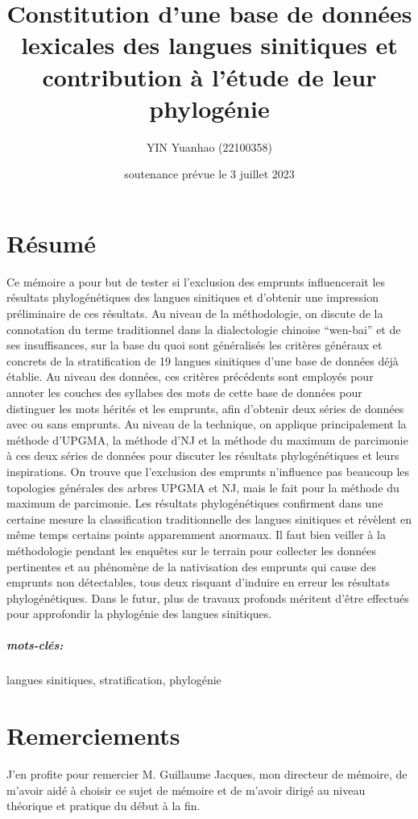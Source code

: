 \documentclass{scrbook}
\title{Constitution d'une base de données lexicales des langues sinitiques et contribution à l'étude de leur phylogénie}
\author{YIN Yuanhao (22100358)}
\date{soutenance prévue le 3 juillet 2023}%
\newcounter{c}[subsubsection]
\begin{document}
\maketitle
\begin{sloppypar}

\frontmatter
\chapter{Résumé}
Ce mémoire a pour but de tester si l'exclusion des emprunts influencerait les résultats phylogénétiques des langues sinitiques et d'obtenir une impression préliminaire de ces résultats. Au niveau de la méthodologie, on discute de la connotation du terme traditionnel dans la dialectologie chinoise ``wen-bai'' et de ses insuffisances, sur la base du quoi sont généralisés les critères généraux et concrets de la stratification de 19 langues sinitiques d'une base de données déjà établie. Au niveau des données, ces critères précédents sont employés pour annoter les couches des syllabes des mots de cette base de données pour distinguer les mots hérités et les emprunts, afin d'obtenir deux séries de données avec ou sans emprunts. Au niveau de la technique, on applique principalement la méthode d'UPGMA, la méthode d'NJ et la méthode du maximum de parcimonie à ces deux séries de données pour discuter les résultats phylogénétiques et leurs inspirations. On trouve que l'exclusion des emprunts n'influence pas beaucoup les topologies générales des arbres UPGMA et NJ, mais le fait pour la méthode du maximum de parcimonie. Les résultats phylogénétiques confirment dans une certaine mesure la classification traditionnelle des langues sinitiques et révèlent en même temps certains points apparemment anormaux. Il faut bien veiller à la méthodologie pendant les enquêtes sur le terrain pour collecter les données pertinentes et au phénomène de la nativisation des emprunts qui cause des emprunts non détectables, tous deux risquant d'induire en erreur les résultats phylogénétiques. Dans le futur, plus de travaux profonds méritent d'être effectués pour approfondir la phylogénie des langues sinitiques.
\paragraph{mots-clés:} langues sinitiques, stratification, phylogénie

\chapter{Remerciements}
J'en profite pour remercier M. Guillaume Jacques, mon directeur de mémoire, de m'avoir aidé à choisir ce sujet de mémoire et de m'avoir dirigé au niveau théorique et pratique du début à la fin.


\end{sloppypar}
\end{document}
